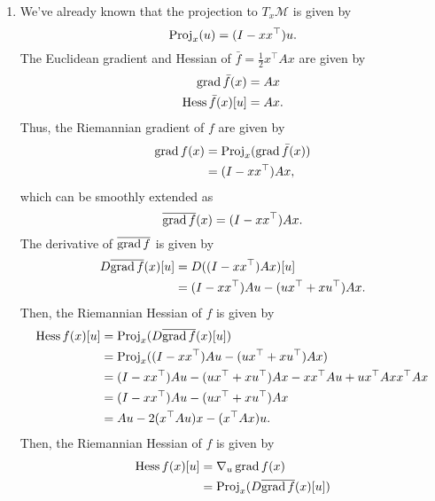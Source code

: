 \documentclass[en, oneside]{assignment}
\begin{document}
 \begin{sol}
    \begin{enumerate}[label=(\arabic*)]
        \item We've already known that the projection to $T_x\mathcal{M}$ is given by
        \begin{equation*}
            \operatorname{Proj}_x(u) = (I - x x^\top) u.
        \end{equation*}
        The Euclidean gradient and Hessian of $\bar f = \frac{1}{2} x^\top A x$ are given by
        \begin{align*}
            \operatorname{grad} \bar f(x) &= A x\\
            \operatorname{Hess} \bar f(x)[u] &= A x.
        \end{align*}
        Thus, the Riemannian gradient of $f$ are given by
        \begin{align*}
            \operatorname{grad} f(x) &= \operatorname{Proj}_x(\operatorname{grad} \bar f(x))\\
            &= (I - x x^\top) A x,
        \end{align*}
        which can be smoothly extended as
        \begin{equation*}
            \overline{\operatorname{grad} f}(x) = (I - x x^\top) A x.
        \end{equation*}
        The derivative of $\overline{\operatorname{grad} f}$ is given by
        \begin{align*}
            D \overline{\operatorname{grad} f}(x)[u] &= D((I - x x^\top) A x)[u]\\
            &= (I - x x^\top) A u - (u x^\top + x u^\top) A x.
        \end{align*}
        Then, the Riemannian Hessian of $f$ is given by
        \begin{align*}
            \operatorname{Hess} f(x)[u] &= \operatorname{Proj}_x(D \overline{\operatorname{grad} f}(x)[u])\\
            &= \operatorname{Proj}_x((I - x x^\top) A u - (u x^\top + x u^\top) A x)\\
            &= (I - x x^\top) A u - (u x^\top + x u^\top) A x - x x^\top A u + u x^\top A x x^\top A x\\
            &= (I - x x^\top) A u - (u x^\top + x u^\top) A x\\
            &= A u - 2(x^\top A u) x - (x^\top A x) u.
        \end{align*}
        Then, the Riemannian Hessian of $f$ is given by
        \begin{align*}
            \Hess f(x)[u] &= \nabla_u \grad f(x)\\
            &= \Proj_x(D \overline{\grad f}(x)[u])\\

\end{align*}
\end{enumerate}
\end{sol}
\end{document}
